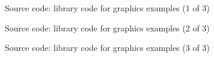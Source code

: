 \begin{figure}\ContinuedFloat
  \small
  
  \caption{Source code: library code for graphics examples (1 of 3)}
\end{figure}
\begin{figure}\ContinuedFloat
  \small
  
  \caption{Source code: library code for graphics examples (2 of 3)}
\end{figure}
\begin{figure}\ContinuedFloat
  \small
  
  \caption{Source code: library code for graphics examples (3 of 3)}
\end{figure}
